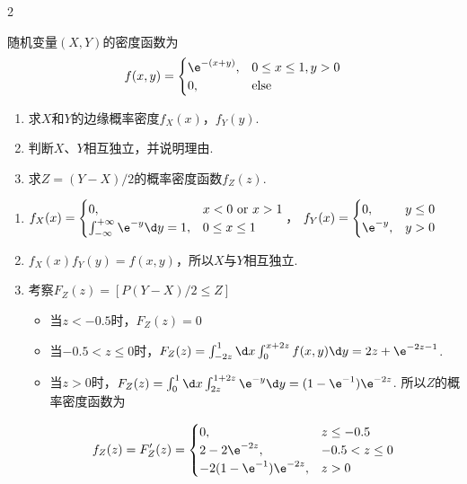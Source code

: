 \begin{paracol}{2}
\begin{problem}
    随机变量$(X,Y)$的密度函数为
    \[f(x,y)=\begin{cases}
        \e^{-(x+y)}, & 0\leq x\leq1,y>0\\
        0, & \text{else}
    \end{cases}\]
    \switchcolumn
    \begin{enumerate}
        \item 求$X$和$Y$的边缘概率密度$f_X(x)$，$f_Y(y)$.
        \item 判断$X$、$Y$相互独立，并说明理由.
        \item 求$Z=(Y-X)/2$的概率密度函数$f_Z(z)$.
    \end{enumerate}
\end{problem}
\end{paracol}
\begin{solution}\leavevmode
    \begin{enumerate}
        \item $f_X(x)=\begin{cases}
            0, & x<0\ \text{or}\ x>1\\
            \int_{-\infty}^{+\infty}\e^{-y}\d y=1, & 0\leq x\leq1
        \end{cases}$，
        $f_Y(x)=\begin{cases}
            0, & y\leq0\\
            \e^{-y}, & y>0
        \end{cases}$
        \item $f_X(x)f_Y(y)=f(x,y)$，所以$X$与$Y$相互独立.
        \item 考察$F_Z(z)=[P(Y-X)/{2}\leq Z]$
        \begin{itemize}
            \item 当$z<-0.5$时，$F_Z(z)=0$
            \item 当$-0.5<z\leq0$时，$F_Z(z)=\int_{-2z}^1\d x\int_0^{x+2z}f(x,y)\d y=2z+\e^{-2z-1}$.
            \item 当$z>0$时，$F_Z(z)=\int_0^1\d x\int_{2z}^{1+2z}\e^{-y}\d y=(1-\e^{-1})\e^{-2z}$. 所以$Z$的概率密度函数为
        \end{itemize}
        \[f_Z(z)=F'_Z(z)=\begin{cases}
            0, & z\leq-0.5\\
            2-2\e^{-2z}, & -0.5<z\leq0\\
            -2(1-\e^{-1})\e^{-2z}, & z>0
        \end{cases}\]
    \end{enumerate}
\end{solution}

